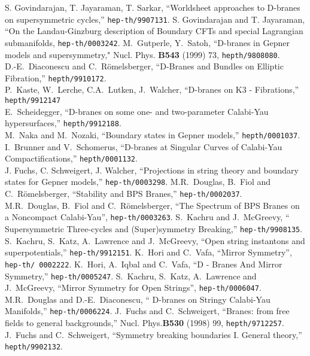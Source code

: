 \documentclass[a4paper,12pt]{article}
\begin{document}
\begin{thebibliography}{99}
S. Govindarajan, T. Jayaraman, T. Sarkar, ``Worldsheet approaches to D-branes 
on supersymmetric cycles,'' {\tt hep-th/9907131}.
 S. Govindarajan and T. Jayaraman, ``On the
Landau-Ginzburg description of Boundary CFTs and special Lagrangian 
submanifolds, {\tt hep-th/0003242}.
M.~Gutperle, Y.~Satoh, ``D-branes in Gepner models
and supersymmetry," Nucl. Phys. {\bf B543} (1999) 73, {\tt hepth/9808080}. \\
D.-E.~Diaconescu and C.~R\"omelsberger, 
``D-Branes and Bundles on Elliptic Fibration,'' {\tt hepth/9910172}. \\
P.~Kaste, W.~Lerche, C.A.~Lutken, J.~Walcher, ``D-branes on K3 - Fibrations,''
{\tt hepth/9912147} \\
E.~Scheidegger, ``D-branes on some one- and two-parameter Calabi-Yau
hypersurfaces,'' {\tt hepth/9912188}. \\
M.~Naka and M.~Nozaki, ``Boundary states in Gepner models,''
{\tt hepth/0001037}. \\
I.~Brunner and V.~Schomerus, ``D-branes at Singular Curves of Calabi-Yau
Compactifications,'' {\tt hepth/0001132}.\\
J. Fuchs, C. Schweigert, J. Walcher, ``Projections in string theory and
boundary states for Gepner models,'' {\tt hep-th/0003298}.
M.R.~Douglas, B.~Fiol and C.~R\"omelsberger,
``Stability and BPS Branes,'' {\tt hep-th/0002037}. \\
M.R.~Douglas, B.~Fiol and C.~R\"omelsberger,
``The Spectrum of BPS Branes on a Noncompact
Calabi-Yau'', {\tt hep-th/0003263}.
S.~Kachru and J.~McGreevy, `` Supersymmetric Three-cycles and 
(Super)symmetry Breaking,'' {\tt hep-th/9908135}. \\
S.~Kachru, S.~Katz, A.~Lawrence and J.~McGreevy, ``Open string
instantons and superpotentials,'' {\tt hep-th/9912151}.
 K.~Hori and C.~Vafa, ``Mirror Symmetry'', {\tt hep-th/
0002222}.
 K.~Hori, A.~Iqbal and C.~Vafa, ``D - Branes And Mirror
Symmetry,'' {\tt hep-th/0005247}.
 S.~Kachru, S.~Katz, A.~Lawrence and
J.~McGreevy, ``Mirror Symmetry for Open Strings'',
{\tt hep-th/0006047}.
 M.R.~Douglas and D.-E.~Diaconescu, ``
D-branes on Stringy Calabi-Yau Manifolds,'' {\tt hep-th/0006224}.
 J.~Fuchs and C.~Schweigert, ``Branes: from free fields to
general backgrounds,'' Nucl. Phys.{\bf B530} (1998) 99,   
{\tt hepth/9712257}. \\
J.~Fuchs and C.~Schweigert, ``Symmetry breaking
boundaries I. General theory,'' {\tt hepth/9902132}. \\

\end{thebibliography}
\end{document}
